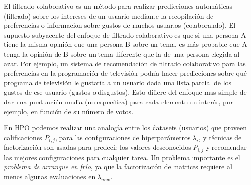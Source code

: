 
El filtrado colaborativo es un método para realizar predicciones automáticas (filtrado) sobre los intereses de un usuario mediante la recopilación de preferencias o información sobre gustos de muchos usuarios (colaborando). El supuesto subyacente del enfoque de filtrado colaborativo es que si una persona A tiene la misma opinión que una persona B sobre un tema, es más probable que A tenga la opinión de B sobre un tema diferente que la de una persona elegida al azar. Por ejemplo, un sistema de recomendación de filtrado colaborativo para las preferencias en la programación de televisión podría hacer predicciones sobre qué programa de televisión le gustaría a un usuario dada una lista parcial de los gustos de ese usuario (gustos o disgustos). Esto difiere del enfoque más simple de dar una puntuación media (no específica) para cada elemento de interés, por ejemplo, en función de su número de votos.

En HPO podemos realizar una analogía entre los datasets (usuarios) que proveen calificaciones $P_{i,j}$, para las configuraciones de hiperparámetros $\lambda_i$, y técnicas de factorización son usadas para predecir los valores desconocidos $P_{i,j}$ y recomendar las mejores configuraciones para cualquier tarea. Un problema importante es el \textit{problema de arranque en frío}, ya que la factorización de matrices requiere al menos algunas evaluaciones en $\lambda_{new}$.

